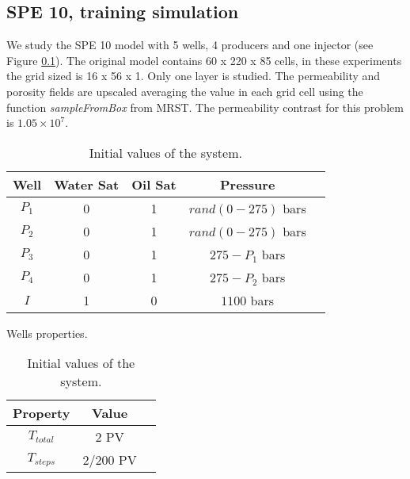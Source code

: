\documentclass[12pt]{article}
\begin{document}
\newpage
\newpage

\subsection{SPE 10, training simulation}
We study the SPE 10 model with 5 wells, 4 producers and one injector (see Figure \ref{}).  
The original model contains 60 x 220 x 85 cells, in these experiments the grid sized is 16 x 56 x 1. Only one layer is studied. The permeability and porosity fields are upscaled averaging the value in each grid cell using the function \emph{sampleFromBox} from MRST. The permeability contrast for this problem is $1.05\times 10^7$. 
\begin{table}[!ht]
\hspace{-1cm}
\begin{minipage}{.5\textwidth}
\centering
\begin{tabular}{ |c|c|c|c|c|} 
\hline
Well&Water Sat&Oil Sat&Pressure\\
\hline
$P_1$&     0&    1 & $rand(0-275)$ bars \\  
$P_2$& 0& 1& $rand(0-275)$ bars\\
$P_3$&     0&    1 & $275-P_1$ bars \\  
$P_4$& 0& 1& $275-P_2$ bars\\
$I$&     1&    0 & $1100$ bars\\  
\hline
\end{tabular}
\caption{Wells properties.}\label{table:wells5spe}
\end{minipage}%
\hspace{1cm}
\begin{minipage}{.4\textwidth}
\centering
\begin{tabular}{ |c|c|c|} 
\hline
Property&Value\\
\hline
    $T_{total}$&     2 PV\\
$T_{steps}$& 2/200 PV\\
\hline
\end{tabular}\caption{Initial values of the system.}
\label{table:icw}
\end{minipage}
\hspace{1cm} 
\end{table} 
\end{document}
